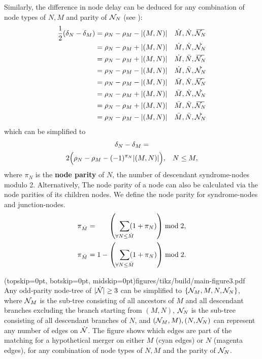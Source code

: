 Similarly, the difference in node delay can be deduced for any combination of node types of $N,M$ and parity of $\mathcal{N}_N$ (see ):
\begin{align*}
  \frac{1}{2}(\delta_N-\delta_M) &= \rho_N - \rho_M - \abs{(M,N)}  &\dot{M}, \dot{N}, \overbar{\nset_N} \\
  &= \rho_N - \rho_M + \abs{(M,N)}  &\dot{M}, \dot{N}, \dot{\nset_N} \\
  &= \rho_N - \rho_M + \abs{(M,N)}  &\dot{M}, \bar{N}, \overbar{\nset_N} \\
  &= \rho_N - \rho_M - \abs{(M,N)}  &\dot{M}, \bar{N}, \dot{\nset_N} \\
  &= \rho_N - \rho_M - \abs{(M,N)}  &\bar{M}, \dot{N}, \overbar{\nset_N} \\
  &= \rho_N - \rho_M + \abs{(M,N)}  &\bar{M}, \dot{N}, \dot{\nset_N} \\
  &= \rho_N - \rho_M + \abs{(M,N)}  &\bar{M}, \bar{N}, \overbar{\nset_N} \\
  &= \rho_N - \rho_M - \abs{(M,N)}  &\bar{M}, \bar{N}, \dot{\nset_N} \\
\end{align*}
which can be simplified to 
\begin{multline}\label{eq:pmwdif}
    \delta_N - \delta_M = \\
    2\Big(\rho_N-\rho_M - (-1)^{\pi_N}\lvert(M,N)\rvert\Big), \hspace{.3cm} N\leq M,
\end{multline}
where $\pi_N$ is the \textbf{node parity} of $N$, the number of descendant syndrome-nodes modulo 2. Alternatively, The node parity of a node can also be calculated via the node parities of its children nodes. We define the node parity for syndrome-nodes and junction-nodes. 
\begin{align}
    \pi_{\dot{M}} &= \hspace{.6cm}\left(\hspace{.2cm} \sum_{\mathclap{\forall N \leq \dot{M}}} (1+\pi_N) \right ) \bmod 2, \label{eq:snodeparity}\\
    \pi_{\bar{M}} &= 1 - \left(\hspace{.2cm} \sum_{\mathclap{\forall N \leq \bar{M}}} (1+\pi_N) \right) \bmod 2. \label{eq:jnodeparity}
\end{align}

\Figure[hbt!](topskip=0pt, botskip=0pt, midskip=0pt){figures/tikz/build/main-figure3.pdf}{
  Any odd-parity node-tree of $\lvert\dot{\mathcal{N}}\rvert\geq 3$ can be simplified to $\{\mathcal{N}_M,M,N,\mathcal{N}_N\}$, where $\mathcal{N}_M$ is the sub-tree consisting of all ancestors of $M$ and all descendant branches excluding the branch starting from $(M,N)$, $\mathcal{N}_N$ is the sub-tree consisting of all descendant branches of $N$, and $(\mathcal{N}_M, M), (N, \mathcal{N}_N)$ can represent any number of edges on $\dot{\mathcal{N}}$. The figure shows which edges are part of the matching for a hypothetical merger on either $M$ (cyan edges) or $N$ (magenta edges), for any combination of node types of $N,M$ and the parity of $\mathcal{N}_N$.
  \label{fig:nmcombi}}

